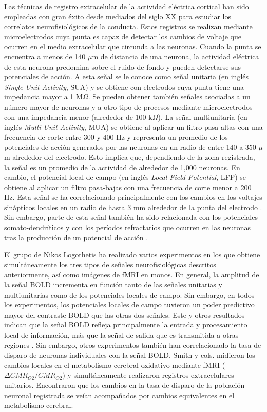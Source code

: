 Las técnicas de registro extracelular de la actividad eléctrica cortical han sido empleadas con gran éxito desde mediados del siglo \textsc{XX} para estudiar los correlatos neurofisiológicos de la conducta. Estos registros se realizan mediante microelectrodos cuya punta es capaz de detectar los cambios de voltaje que ocurren en el medio extracelular que circunda a las neuronas. Cuando la punta se encuentra a menos de 140 $\mu$m de distancia de una neurona, la actividad eléctrica de esta neurona predomina sobre el ruido de fondo y pueden detectarse sus potenciales de acción. A esta señal se le conoce como señal unitaria (en inglés\emph{ Single Unit Activity}, SUA) y se obtiene con electrodos cuya punta tiene una impedancia mayor a 1 M$\Omega$. Se pueden obtener también señales asociadas a un número mayor de neuronas y a otro tipo de procesos mediante microelectrodos con una impedancia menor (alrededor de 100 k$\Omega$). La señal multiunitaria (en inglés \emph{Multi-Unit Activity}, MUA) se obtiene al aplicar un filtro pasa-altas con una frecuencia de corte entre 300 y 400 Hz y representa un promedio de los potenciales de acción generados por las neuronas en un radio de entre 140 a 350 $\mu$m alrededor del electrodo. Esto implica que, dependiendo de la zona registrada, la señal es un promedio de la actividad de alrededor de 1,000 neuronas. En cambio, el potencial local de campo (en inglés \emph{Local Field Potential}, LFP) se obtiene al aplicar un filtro pasa-bajas con una frecuencia de corte menor a 200 Hz. Esta señal se ha correlacionado principalmente con los cambios en los voltajes sinápticos locales en un radio de hasta 3 mm alrededor de la punta del electrodo \cite{NK2003,LogothetisNK2004}. Sin embargo, parte de esta señal también ha sido relacionada con los potenciales somato-dendríticos y con los períodos refractarios que ocurren en las neuronas tras la producción de un potencial de acción \cite{NK2003}.

El grupo de Nikos Logothetis ha realizado varios experimentos en los que obtiene simultáneamente los tres tipos de señales neurofisiológicas descritos anteriormente, así como imágenes de fMRI en monos. En general, la amplitud de la señal BOLD incrementa en función tanto de las señales unitarias y multiunitarias como de los potenciales locales de campo. Sin embargo, en todos los experimentos, los potenciales locales de campo tuvieron un poder predictivo mayor del contraste BOLD que las otras dos señales. Este y otros resultados indican que la señal BOLD refleja principalmente la entrada y procesamiento local de información, más que la señal de salida que es transmitida a otras regiones \cite{NK2003,NK2008,LogothetisNK2004}. Sin embargo, otros experimentos también han correlacionado la tasa de disparo de neuronas individuales con la señal BOLD. Smith y cols. \cite{SmithAJ2002} midieron los cambios locales en el metabolismo cerebral oxidativo mediante fMRI ($\Delta CMR_{O2}/CMR_{O2}$) y simultáneamente realizaron registros extracelulares unitarios. Encontraron que los cambios en la tasa de disparo de la población neuronal registrada se veían acompañados por cambios equivalentes en el metabolismo cerebral.

